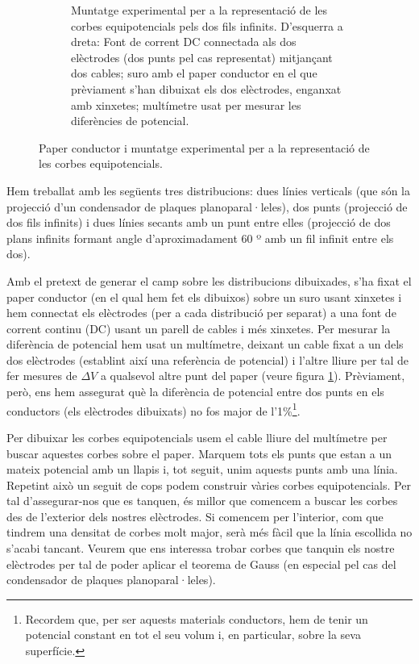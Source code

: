 \documentclass[a4paper,10.5pt]{report}
\begin{document}
\begin{figure}[h]
\begin{subfigure}{0.45\textwidth}
		\caption{Muntatge experimental per a la representació de les corbes equipotencials pels dos fils infinits. D'esquerra a dreta: Font de corrent DC connectada als dos elèctrodes (dos punts pel cas representat) mitjançant dos cables; suro amb el paper conductor en el que prèviament s'han dibuixat els dos elèctrodes, enganxat amb xinxetes; multímetre usat per mesurar les diferències de potencial.}
		\label{fig1.1b}
	\end{subfigure}
	\caption{Paper conductor i muntatge experimental per a la representació de les corbes equipotencials.}
	\label{fig1.1}
\end{figure}

Hem treballat amb les següents tres distribucions: dues línies verticals (que són la projecció d'un condensador de plaques planoparal·leles), dos punts (projecció de dos fils infinits) i dues línies secants amb un punt entre elles (projecció de dos plans infinits formant angle d'aproximadament 60 º amb un fil infinit entre els dos).

Amb el pretext de generar el camp sobre les distribucions dibuixades, s'ha fixat el paper conductor (en el qual hem fet els dibuixos) sobre un suro usant xinxetes i hem connectat els elèctrodes (per a cada distribució per separat) a una font de corrent continu (DC) usant un parell de cables i més xinxetes. Per mesurar la diferència de potencial hem usat un multímetre, deixant un cable fixat a un dels dos elèctrodes (establint així una referència de potencial) i l'altre lliure per tal de fer mesures de $\Delta V$ a qualsevol altre punt del paper (veure figura \ref{fig1.1b}). Prèviament, però, ens hem assegurat què la diferència de potencial entre dos punts en els conductors (els elèctrodes dibuixats) no fos major de l'1\%\footnote{Recordem que, per ser aquests materials conductors, hem de tenir un potencial constant en tot el seu volum i, en particular, sobre la seva superfície.}.

Per dibuixar les corbes equipotencials usem el cable lliure del multímetre per buscar aquestes corbes sobre el paper. Marquem tots els punts que estan a un mateix potencial amb un llapis i, tot seguit, unim aquests punts amb una línia. Repetint això un seguit de cops podem construir vàries corbes equipotencials. Per tal d'assegurar-nos que es tanquen, és millor que comencem a buscar les corbes des de l'exterior dels nostres elèctrodes. Si comencem per l'interior, com que tindrem una densitat de corbes molt major, serà més fàcil que la línia escollida no s'acabi tancant. Veurem que ens interessa trobar corbes que tanquin els nostre elèctrodes per tal de poder aplicar el teorema de Gauss (en especial pel cas del condensador de plaques planoparal·leles).
\end{document}
